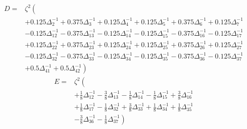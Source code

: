 \documentclass[11pt]{article}
\begin{document}
\begin{equation*}\begin{split}D=&\zeta^2\left(\right.\\
&+0.125\Delta_{2}^{-1}+0.375\Delta_{3}^{-1}+0.125\Delta_{4}^{-1}+0.125\Delta_{5}^{-1}+0.375\Delta_{6}^{-1}+0.125\Delta_{7}^{-1}\\
&-0.125\Delta_{12}^{-1}-0.375\Delta_{13}^{-1}-0.125\Delta_{14}^{-1}-0.125\Delta_{15}^{-1}-0.375\Delta_{16}^{-1}-0.125\Delta_{17}^{-1}\\
&+0.125\Delta_{22}^{-1}+0.375\Delta_{23}^{-1}+0.125\Delta_{24}^{-1}+0.125\Delta_{25}^{-1}+0.375\Delta_{26}^{-1}+0.125\Delta_{27}^{-1}\\
&-0.125\Delta_{32}^{-1}-0.375\Delta_{33}^{-1}-0.125\Delta_{34}^{-1}-0.125\Delta_{35}^{-1}-0.375\Delta_{36}^{-1}-0.125\Delta_{37}^{-1}\\
&+0.5\Delta_{41}^{-1}+0.5\Delta_{42}^{-1}\left.\right)\end{split}\end{equation*}\newline
\begin{equation*}\begin{split}E=&\zeta^2\left(\right.\\
&+\frac{1}{8}\Delta_{12}^{-1}-\frac{3}{8}\Delta_{13}^{-1}-\frac{1}{8}\Delta_{14}^{-1}-\frac{1}{8}\Delta_{15}^{-1}+\frac{3}{8}\Delta_{16}^{-1}\\
&+\frac{1}{8}\Delta_{17}^{-1}-\frac{1}{8}\Delta_{32}^{-1}+\frac{3}{8}\Delta_{33}^{-1}+\frac{1}{8}\Delta_{34}^{-1}+\frac{1}{8}\Delta_{35}^{-1}\\
&-\frac{3}{8}\Delta_{36}^{-1}-\frac{1}{8}\Delta_{37}^{-1}\left.\right)\end{split}\end{equation*}\newline
\end{document}
